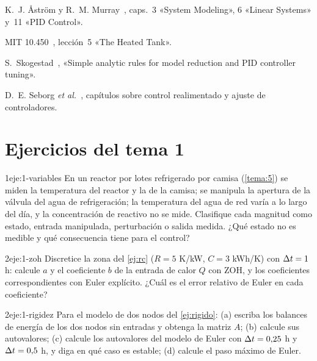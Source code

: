 \begin{lecturas}
\item K.~J. Åström y R.~M. Murray~\cite{am}, caps.~3 «System Modeling», 6 «Linear Systems» y~11 «PID Control».
\item MIT 10.450~\cite{mit10450}, lección~5 «The Heated Tank».
\item S.~Skogestad~\cite{skogestad}, «Simple analytic rules for model reduction and PID controller tuning».
\item D.~E. Seborg \emph{et al.}~\cite{seborg}, capítulos sobre control realimentado y ajuste de controladores.
\end{lecturas}

\section*{Ejercicios del tema 1}

\begin{ejercicio}{1}{eje:1-variables}
En un reactor por lotes refrigerado por camisa (\cref{tema:5}) se miden la temperatura del reactor y la de la camisa; se manipula la apertura de la válvula del agua de refrigeración; la temperatura del agua de red varía a lo largo del día, y la concentración de reactivo no se mide. Clasifique cada magnitud como estado, entrada manipulada, perturbación o salida medida. ¿Qué estado no es medible y qué consecuencia tiene para el control?
\end{ejercicio}

\begin{ejercicio}{2}{eje:1-zoh}
Discretice la zona del \cref{ej:rc} ($R=5$ K/kW, $C=3$ kWh/K) con $\Delta t=1$ h: calcule $a$ y el coeficiente $b$ de la entrada de calor $Q$ con ZOH, y los coeficientes correspondientes con Euler explícito. ¿Cuál es el error relativo de Euler en cada coeficiente?
\end{ejercicio}

\begin{ejercicio}{2}{eje:1-rigidez}
Para el modelo de dos nodos del \cref{ej:rigido}: (a) escriba los balances de energía de los dos nodos sin entradas y obtenga la matriz $A$; (b) calcule sus autovalores; (c) calcule los autovalores del modelo de Euler con $\Delta t=0{,}25$ h y $\Delta t=0{,}5$ h, y diga en qué caso es estable; (d) calcule el paso máximo de Euler.
\end{ejercicio}

